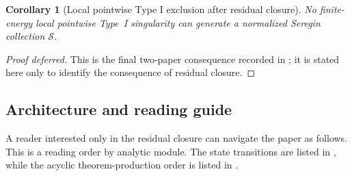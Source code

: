 \documentclass[11pt]{amsart}
\numberwithin{equation}{section}
\theoremstyle{plain}
\newtheorem{corollary}[corollary]{Corollary}
\theoremstyle{definition}
\theoremstyle{remark}
\newcommand{\calS}{\mathcal S}
\begin{document}
\begin{corollary}[Local pointwise Type I exclusion after residual closure]
\label{cor:typeI-exclusion-main}
No finite-energy local pointwise Type~I singularity can generate a normalized
Seregin collection \(\calS\).
\end{corollary}

\begin{proof}[Proof deferred]
This is the final two-paper consequence recorded in
; it is stated here only to identify
the consequence of residual closure.
\end{proof}

\subsection{Architecture and reading guide}
\label{subsec:reading-guide}

A reader interested only in the residual closure can navigate the paper as
follows.  This is a reading order by analytic module.  The state transitions
are listed in , while the acyclic
theorem-production order is listed in
.
\end{document}
